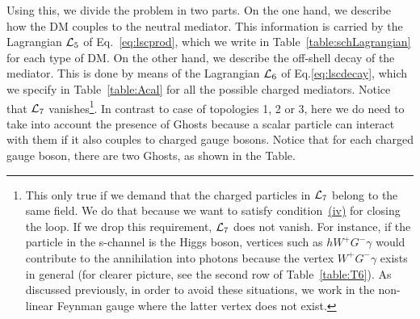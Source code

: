 Using this,  we divide the problem in two parts. On the one hand, we describe how the DM couples to the neutral mediator. This information is carried by the Lagrangian ${\cal L}_5$ of Eq.~\eqref{eq:lscprod}, which we write in  Table~\ref{table:schLagrangian} for each type of DM.  On the other  hand, we describe the off-shell decay of the mediator.  This is done by means of the Lagrangian ${\cal L}_6$ of Eq.\eqref{eq:lscdecay}, which we specify in Table~\ref{table:Acal} for all the possible charged mediators.  Notice that ${\cal L}_7$ vanishes\footnote{This only true if we demand that the charged particles in ${\cal L}_7$ belong to the same field. We do that because we want to satisfy condition~\hyperref[condition:iv]{(iv)} for closing the loop. If we drop this requirement, ${\cal L}_7$ does not vanish. For instance, if the particle in the s-channel is the Higgs boson, vertices such as $h W^+G^-\gamma $ would contribute to the annihilation into photons because the vertex $W^+G^- \gamma$ exists in general (for clearer picture, see the second row of Table~\ref{table:T6}). As discussed previously, in order to avoid these situations, we work in the non-linear Feynman gauge where the latter vertex does not exist.}. In contrast to case of topologies 1, 2 or 3, here we do need to take into account the presence of Ghosts because a scalar particle can interact with them if it also couples to charged gauge bosons. Notice that for each charged gauge boson, there are two  Ghosts, as shown in the Table.  

